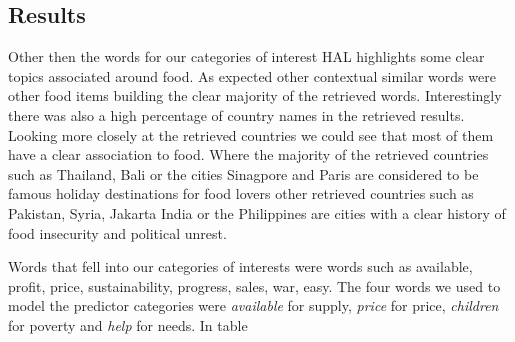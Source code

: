 \documentclass[12pt]{report}
\begin{document}
\subsection{Results}


Other then the words for our categories of interest HAL highlights some clear topics associated around food. As expected other contextual similar words were other food items building the clear majority of the retrieved words. Interestingly there was also a high percentage of country names in the retrieved results. Looking more closely at the retrieved countries we could see that most of them have a clear association to food. Where the majority of the retrieved countries such as Thailand, Bali or the cities Sinagpore and Paris are considered to be famous holiday destinations for food lovers other retrieved countries such as Pakistan, Syria, Jakarta India or the Philippines are cities with a clear history of food insecurity and political unrest. 

Words that fell into our categories of interests were words such as available, profit, price, sustainability, progress, sales,  war, easy. The four words we used to model the predictor categories were \emph{available} for supply, \emph{price} for price, \emph{children} for poverty and \emph{help} for needs. In table 
\end{document}
